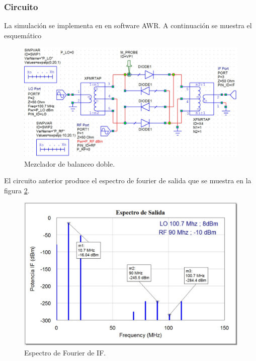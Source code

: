 \documentclass[twocolumn]{article}
\begin{document}
\subsubsection{Circuito}
La simulación se implementa en en software AWR. A continuación se muestra el esquemático
\begin{figure}[h]
  \centering    
	\includegraphics[width=\columnwidth]{imagenes/circuito3.jpg}
	\caption{Mezclador de balanceo doble.}\label{fig:circuito3}
\end{figure}

El circuito anterior produce el espectro de fourier de salida que se muestra en la figura \textcolor{blue}{\ref{fig:IF3}}.
\begin{figure}[h]
  \centering    
	\includegraphics[scale=0.3]{imagenes/IF3.jpg}
	\caption{Espectro de Fourier de IF.}\label{fig:IF3}
\end{figure}
%
\end{document}
